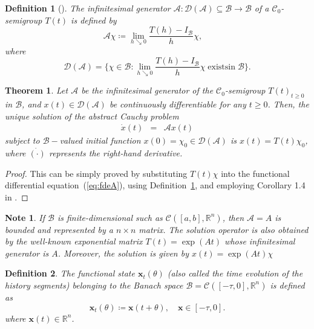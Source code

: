 \documentclass[journal]{IEEEtran}
\newtheorem{thm}{Theorem}
\newtheorem{defn}{Definition}
\newtheorem{note}{Note}
\newcommand{\parB}[1]{\lbrace{#1}\rbrace}
\def\A{ \mathcal A }
\begin{document}
\begin{defn}[{\cite[Definition 3.2]{Breda2014stability}}]\label{defn:infi}
	The \textit{infinitesimal generator} $ \A: \mathcal D (\A) \subseteq \mathcal B  \to \mathcal B $ of a $ \mathcal C_0 $-semigroup $ T(t) $ is defined by
	\begin{equation}\label{key}
		\A\chi\coloneqq \lim\limits_{h \searrow 0} \frac{T(h) -  I_{\mathcal B}}{h}\chi, \quad
	\end{equation}
	where
	\begin{equation}\label{key}
		\mathcal D (\A)=\parB{\chi \in \mathcal B \colon \lim\limits_{h \searrow 0} \frac{T(h) -  I_{\mathcal B}}{h}\chi \operatorname{ exists in } \mathcal B }.
	\end{equation}
\end{defn}
\begin{thm}\label{thm:cauchyproblem}
	Let $ \A $ be the infinitesimal generator of the $ \mathcal C_0 $-semigroup $ T(t)_{t\geq 0} $ in $ \mathcal B $, and  $ x(t)\in \mathcal D(\A) $  be continuously differentiable for any $ t\geq 0 $. Then, the unique solution of the abstract Cauchy problem
	\begin{eqnarray}\label{eq:fdeA} \nonumber
		\dot{x} (t)&=&\A {x} (t)
	\end{eqnarray}
	subject to $ \mathcal B- $valued initial function $  x(0)= \chi_0 \in \mathcal D(\A) $ is  $ x(t) = T(t) \chi_0$,  where $ \dot{ (\cdot)} $ represents the right-hand derivative.

\end{thm}
\begin{proof}
	This can be simply proved by substituting $ T(t) \chi$ into the functional differential equation~(\ref{eq:fdeA}), using Definition~\ref{defn:infi}, and employing Corollary 1.4 in \cite{Pazy2012semigroups}.
\end{proof}

\begin{note}
	If $ \mathcal B $ is finite-dimensional such as $ \mathcal C([a,b],\mathbb R^n) $, then $ \A=A $ is bounded and represented by a $ n \times n $ matrix. The solution operator is also obtained by the well-known exponential matrix $ T(t)=\exp(A t) $ whose infinitesimal generator is  $ A $. Moreover, the solution is given by $ x(t)= \exp(A t)  \chi$
\end{note}
\begin{defn}\label{def:nonlocalstate}
	The functional state $ {\mathbf x}_t(\theta) $ (also called the time evolution of the history segments) belonging to the Banach space $ \mathcal B=\mathcal C([-\tau,0],\mathbb R^n) $ is defined as
	\begin{equation}\label{eq:xt}
		\mathbf x_t(\theta)\coloneqq \mathbf x(t+\theta), \quad \mathbf x\in[-\tau,0].
	\end{equation}
	where $ \mathbf x(t) \in \mathbb R^n $.
\end{defn}
\end{document}
